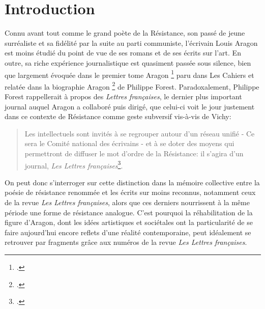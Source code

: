 \chapter*{Introduction}
Connu avant tout comme le grand poète de la Résistance, son passé de jeune surréaliste et sa fidélité par la suite au parti communiste, l'écrivain Louis Aragon est moins étudié du point de vue de ses romans et de ses écrits sur l'art. En outre, sa riche expérience journalistique est quasiment passée sous silence, bien que largement évoquée dans le premier tome Aragon \footcite[]{cahiers} paru dans Les Cahiers et relatée dans la biographie Aragon \footcite[]{biographie}  de Philippe Forest. Paradoxalement, Philippe Forest rappellerait à propos des \emph{Lettres françaises}, le dernier plus important journal auquel Aragon a collaboré puis dirigé, que celui-ci voit le jour justement dans ce contexte de Résistance comme geste subversif vis-à-vis de Vichy:

\begin{quote} 
Les intellectuels sont invités à se regrouper autour d'un réseau unifié - Ce sera le Comité national des écrivains - et à se doter des moyens qui permettront de diffuser le mot d'ordre de la Résistance: il s'agira d'un journal, \emph{Les Lettres françaises}\footcite[]{biographie}.
\end{quote}
On peut donc s'interroger sur cette distinction dans la mémoire collective entre la poésie de résistance renommée et les écrits sur  moins reconnus, notamment ceux de la revue \emph{Les Lettres françaises}, alors que ces derniers nourrissent à la même période une forme de résistance analogue. C’est pourquoi la réhabilitation de la figure d’Aragon, dont les idées artistiques et sociétales ont la particularité de se faire aujourd’hui encore reflets d’une réalité contemporaine, peut
idéalement se retrouver par fragments grâce aux numéros de la revue \emph{Les Lettres françaises}.
